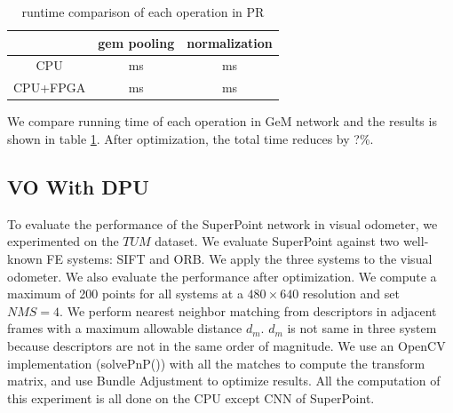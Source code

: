 \begin{table}
    \label{tab:gem_eff}
    \centering 
    \caption{runtime comparison of each operation in PR}
    \begin{tabular}{|c|c|c|}
				\hline
              & gem pooling & normalization \\
        \hline
        CPU   &   ms &   ms \\
        \hline
        CPU+FPGA &   ms &   ms \\
			  \hline
    \end{tabular}
  \end{table}

We compare running time of each operation in GeM network and the results is shown in table \ref{tab:gem_eff}. After optimization, the total time reduces by ?\%.


\subsection{ VO With DPU }

To evaluate the performance of the SuperPoint network in visual odometer, we experimented on the $TUM$ dataset. We evaluate SuperPoint against two well-known FE systems: SIFT\cite{Lowe-478} and ORB\cite{RubleeRabaud-479}. We apply the three systems to the visual odometer. We also evaluate the performance after optimization. We compute a maximum of 200 points for all systems at a $480\times640$ resolution and set $NMS=4$. We perform nearest neighbor matching from descriptors in adjacent frames with a maximum allowable distance $d_m$. $d_m$ is not same in three system because descriptors are not in the same order of magnitude. We use an OpenCV implementation (solvePnP()) with all the matches to compute the transform matrix, and use Bundle Adjustment to optimize results. All the computation of this experiment is all done on the CPU except CNN of SuperPoint. 

